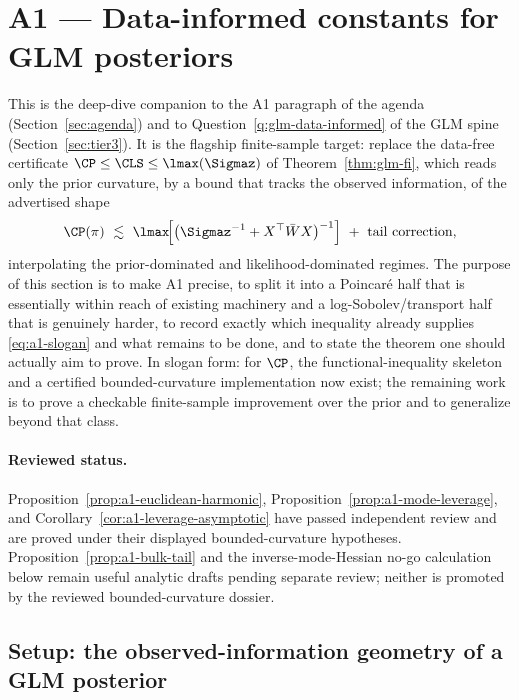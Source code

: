 \documentclass[../../main.tex]{subfiles}
\begin{document}
\section{A1 --- Data-informed constants for GLM posteriors}
\label{sec:a1}

This is the deep-dive companion to the A1 paragraph of the agenda (Section~\ref{sec:agenda}) and
to Question~\ref{q:glm-data-informed} of the GLM spine (Section~\ref{sec:tier3}). It is the
flagship finite-sample target: replace the data-free certificate
$\CP\le\CLS\le\lmax(\Sigmaz)$ of Theorem~\ref{thm:glm-fi}, which reads only the prior curvature,
by a bound that tracks the observed information, of the advertised shape
\begin{equation}\label{eq:a1-slogan}
  \CP(\pi)\ \lesssim\ \lmax\!\Big[\big(\Sigmaz^{-1}+X^\top\bar W X\big)^{-1}\Big]
  \ +\ \text{tail correction},
\end{equation}
interpolating the prior-dominated and likelihood-dominated regimes. The purpose of this section is
to make A1 precise, to split it into a Poincar\'e half that is essentially within reach of existing
machinery and a log-Sobolev/transport half that is genuinely harder, to record exactly which
inequality already supplies \eqref{eq:a1-slogan} and what remains to be done, and to state the
theorem one should actually aim to prove. In slogan form: for \(\CP\), the functional-inequality
skeleton and a certified bounded-curvature implementation now exist; the remaining work is to
prove a checkable finite-sample improvement over the prior and to generalize beyond that class.

\paragraph{Reviewed status.}
Proposition~\ref{prop:a1-euclidean-harmonic}, Proposition~\ref{prop:a1-mode-leverage}, and
Corollary~\ref{cor:a1-leverage-asymptotic} have passed independent review and are proved under
their displayed bounded-curvature hypotheses. Proposition~\ref{prop:a1-bulk-tail} and the
inverse-mode-Hessian no-go calculation below remain useful analytic drafts pending separate
review; neither is promoted by the reviewed bounded-curvature dossier.

\subsection{Setup: the observed-information geometry of a GLM posterior}
\label{subsec:a1-setup}
\end{document}
